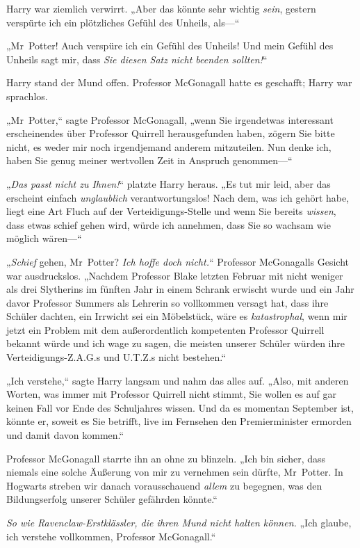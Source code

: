{Harry war ziemlich verwirrt. „Aber das könnte sehr wichtig \emph{sein}, gestern verspürte ich ein plötzliches Gefühl des Unheils, als—“

„Mr~Potter! Auch verspüre ich ein Gefühl des Unheils! Und mein Gefühl des Unheils sagt mir, dass \emph{Sie diesen Satz nicht beenden sollten!}“

Harry stand der Mund offen. Professor McGonagall hatte es geschafft; Harry war sprachlos.

„Mr~Potter,“ sagte Professor McGonagall, „wenn Sie irgendetwas interessant erscheinendes über Professor Quirrell herausgefunden haben, zögern Sie bitte nicht, es weder mir noch irgendjemand anderem mitzuteilen. Nun denke ich, haben Sie genug meiner wertvollen Zeit in Anspruch genommen—“

„\emph{Das passt nicht zu Ihnen!}“ platzte Harry heraus. „Es tut mir leid, aber das erscheint einfach \emph{unglaublich} verantwortungslos! Nach dem, was ich gehört habe, liegt eine Art Fluch auf der Verteidigungs-Stelle und wenn Sie bereits \emph{wissen}, dass etwas schief gehen wird, würde ich annehmen, dass Sie so wachsam wie möglich wären—“

„\emph{Schief} gehen, Mr~Potter? \emph{Ich hoffe doch nicht.}“ Professor McGonagalls Gesicht war ausdruckslos. „Nachdem Professor Blake letzten Februar mit nicht weniger als drei Slytherins im fünften Jahr in einem Schrank erwischt wurde und ein Jahr davor Professor Summers als Lehrerin so vollkommen versagt hat, dass ihre Schüler dachten, ein Irrwicht sei ein Möbelstück, wäre es \emph{katastrophal}, wenn mir jetzt ein Problem mit dem außerordentlich kompetenten Professor Quirrell bekannt würde und ich wage zu sagen, die meisten unserer Schüler würden ihre Verteidigungs-Z.A.G.s und U.T.Z.s nicht bestehen.“

„Ich verstehe,“ sagte Harry langsam und nahm das alles auf. „Also, mit anderen Worten, was immer mit Professor Quirrell nicht stimmt, Sie wollen es auf gar keinen Fall vor Ende des Schuljahres wissen. Und da es momentan September ist, könnte er, soweit es Sie betrifft, live im Fernsehen den Premierminister ermorden und damit davon kommen.“

Professor McGonagall starrte ihn an ohne zu blinzeln. „Ich bin sicher, dass niemals eine solche Äußerung von mir zu vernehmen sein dürfte, Mr~Potter. In Hogwarts streben wir danach vorausschauend \emph{allem} zu begegnen, was den Bildungserfolg unserer Schüler gefährden könnte.“

\emph{So wie Ravenclaw-Erstklässler, die ihren Mund nicht halten können.} „Ich glaube, ich verstehe vollkommen, Professor McGonagall.“

}
